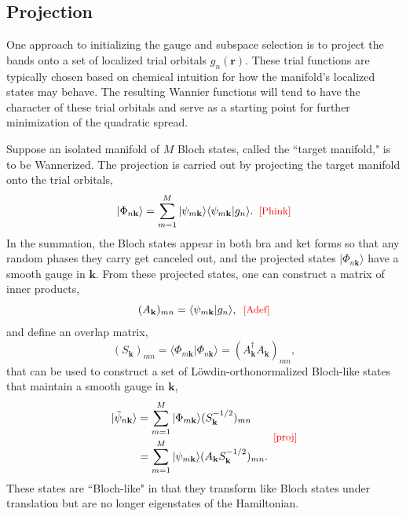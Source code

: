 \documentclass[galley,aps,pra,10pt,amsmath,amssymb,
    superscriptaddress,nofootinbib,longbibliography]{revtex4-2}
\def\Red#1{\textcolor{red}{#1}}
\newcounter{comm}
\newcommand{\seclab}[1]{\label{sec:#1}{\Red{\small\;\;[sec:~#1]}}}
\newcommand{\eqlab}[1]{\Red{\hbox{\small\;\;[#1]}}\label{eq:#1}}
\newcommand{\eqlab}[1]{\label{eq:#1}}
\newcommand{\seclab}[1]{\label{sec:#1}}
\begin{document}
\subsection{Projection}
\seclab{proj}

One approach to initializing the gauge and subspace selection is to project the bands onto a set of localized trial orbitals $g_n(\mathbf{r})$. These trial functions are typically chosen based on chemical intuition for how the manifold's localized states may behave. The resulting Wannier functions will tend to have the character of these trial orbitals and serve as a starting point for further minimization of the quadratic spread. 

Suppose an isolated manifold of $M$ Bloch states, called the ``target manifold," is to be Wannerized. The projection is carried out by projecting the target manifold onto the trial orbitals,
\begin{equation}
    |\Phi_{n \mathbf{k}} \rangle = \sum_{m=1}^M |\psi_{m\mathbf{k}} \rangle \langle \psi_{m\mathbf{k}} | g_n \rangle .
\eqlab{Phink}
\end{equation}
In the summation, the Bloch states appear in both bra and ket forms so that any random phases they carry get canceled out, and the projected states $|\Phi_{n \mathbf{k}} \rangle$ have a smooth gauge in $\mathbf{k}$. From these projected states, one can construct a matrix of inner products, 
\begin{equation}
(A_{\mathbf{k}})_{mn} = \langle \psi_{m\mathbf{k}} | g_n \rangle,
\eqlab{Adef}
\end{equation}
and define an overlap matrix,
\begin{equation}
(S_{\mathbf{k}})_{mn} = \langle \Phi_{m\mathbf{k}} | \Phi_{n\mathbf{k}} \rangle = (A_{\mathbf{k}}^{\dagger} A_{\mathbf{k}})_{mn},
\end{equation}
that can be used to construct a set of Löwdin-ortho\-nor\-malized Bloch-like states that maintain a smooth gauge in $\mathbf{k}$,
\begin{equation}
    \begin{split}
    |\tilde{\psi}_{n\mathbf{k}} \rangle &= \sum_{m=1}^M |\Phi_{m\mathbf{k}} \rangle (S_{\mathbf{k}}^{-1/2})_{mn} \\&= \sum_{m=1}^M |\psi_{m\mathbf{k}} \rangle (A_{\mathbf{k}}S_{\mathbf{k}}^{-1/2})_{mn} .
    \end{split}
    \eqlab{proj}
\end{equation}
These states are ``Bloch-like" in that they transform like Bloch states under translation but are no longer eigenstates of the Hamiltonian.
\end{document}
